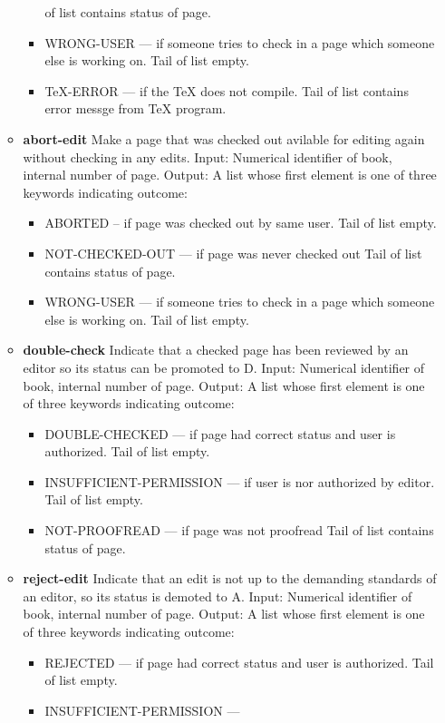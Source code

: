 \begin{itemize}
\begin{itemize}
\begin{itemize}
    of list contains status of page. 
  \item WRONG-USER --- if someone
    tries to check in a page which someone else is working on. Tail of
    list empty. 
  \item TeX-ERROR --- if the TeX does not compile. Tail
    of list contains error messge from TeX program.
  \end{itemize}
\item 
  {\bf abort-edit}  Make a page that was checked out avilable for editing
  again without checking in any edits.  Input: Numerical identifier of
  book, internal number of page.  Output: A list whose first element is
  one of three keywords indicating outcome:
\begin{itemize}
 \item ABORTED -- if page
  was checked out by same user. Tail of list empty. 
\item
  NOT-CHECKED-OUT --- if page was never checked out Tail of list
  contains status of page. 
\item WRONG-USER --- if someone tries to
  check in a page which someone else is working on. Tail of list empty.
\end{itemize}
\item
  {\bf double-check}  Indicate that a checked page has been reviewed by an
  editor so its status can be promoted to D.  Input: Numerical
  identifier of book, internal number of page.  Output: A list whose
  first element is one of three keywords indicating outcome:
  \begin{itemize}
  \item
    DOUBLE-CHECKED --- if page had correct status and user is authorized.
    Tail of list empty. 
  \item INSUFFICIENT-PERMISSION --- if user is
    nor authorized by editor. Tail of list empty. 
  \item NOT-PROOFREAD
    --- if page was not proofread Tail of list contains status of page.
  \end{itemize}
\item
  {\bf reject-edit}  Indicate that an edit is not up to the demanding
  standards of an editor, so its status is demoted to A.  Input:
  Numerical identifier of book, internal number of page.  Output: A
  list whose first element is one of three keywords indicating outcome:
  \begin{itemize}
  \item REJECTED --- if page had correct status and user is
    authorized. Tail of list empty. 
  \item INSUFFICIENT-PERMISSION ---

\end{itemize}
\end{itemize}
\end{itemize}

